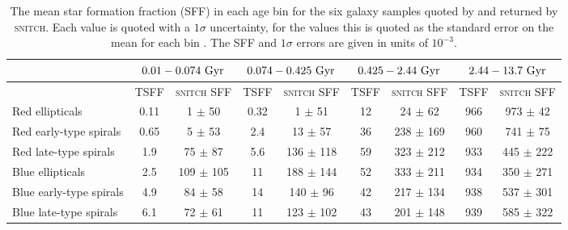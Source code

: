 \documentclass[useAMS,usenatbib]{mn2e}
\begin{document}
\begin{table*}
\centering
\caption{The mean star formation fraction (SFF) in each age bin for the six galaxy samples quoted by \protect\cite[][TSFF]{tojeiro13} and returned by \textsc{snitch}. Each value is quoted with a $1\sigma$ uncertainty, for the \protect\cite{tojeiro13} values this is quoted as the standard error on the mean for each bin . The SFF and $1\sigma$ errors are given in units of $10^{-3}$.}
\label{table:tojeirocompare}
\begin{tabular*}{0.9\textwidth}{l|cc|cc|cc|cc}
                        & \multicolumn{2}{c|}{$0.01 - 0.074~\rm{Gyr}$}     & \multicolumn{2}{c|}{$0.074 - 0.425~\rm{Gyr}$} & \multicolumn{2}{c|}{$0.425 - 2.44~\rm{Gyr}$} & \multicolumn{2}{c}{$2.44 - 13.7~\rm{Gyr}$} \\ \hline
                        & TSFF & \multicolumn{1}{c|}{\textsc{snitch} SFF} & TSFF          & \textsc{snitch} SFF          & TSFF          & \textsc{snitch} SFF         & TSFF         & \textsc{snitch} SFF        \\ \hline
Red ellipticals         & 0.11   &  1 $\pm$ 50  &  0.32  &    1 $\pm$ 51   &  12   &   24 $\pm$ 62   &  966  &   973 $\pm$ 42    \\
Red early-type spirals  & 0.65   &  5 $\pm$ 53  &  2.4   &  13 $\pm$ 57     &  36   &   238 $\pm$ 169   &  960  &  741 $\pm$ 75    \\
Red late-type spirals   &  1.9   &  75 $\pm$ 87   &  5.6   &   136 $\pm$ 118    &  59   &   323 $\pm$ 212   &  933  &   445 $\pm$ 222    \\ \hline
Blue ellipticals        &  2.5   &  109 $\pm$ 105   &  11    &   188 $\pm$ 144    &  52   &   333 $\pm$ 211   &  934  &     350 $\pm$ 271  \\
Blue early-type spirals &  4.9   &  84 $\pm$ 58  &  14    &   140 $\pm$ 96    &  42   &   217 $\pm$ 134   &  938  &  537 $\pm$ 301     \\
Blue late-type spirals  &  6.1   &  72 $\pm$ 61  &  11    &   123 $\pm$ 102    &  43   &    201 $\pm$ 148  &  939  & 585 $\pm$ 322                              
\end{tabular*}
\end{table*}



\end{document}
